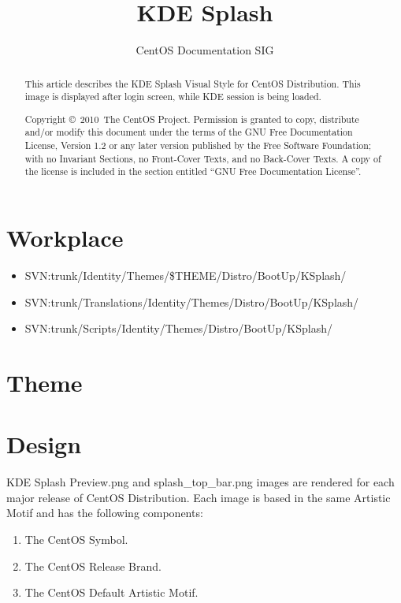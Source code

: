 \documentclass{article}
\title{KDE Splash}
\author{CentOS Documentation SIG}
\begin{document}
\maketitle

\begin{abstract} 

This article describes the KDE Splash Visual Style for CentOS
Distribution.  This image is displayed after login screen, while KDE
session is being loaded. 

Copyright \copyright\ 2010\ The CentOS Project. Permission is
granted to copy, distribute and/or modify this document under the
terms of the GNU Free Documentation License, Version 1.2 or any later
version published by the Free Software Foundation; with no Invariant
Sections, no Front-Cover Texts, and no Back-Cover Texts. A copy of the
license is included in the section entitled ``GNU Free Documentation
License''.  
\end{abstract}

\tableofcontents


\section{Workplace}
\begin{itemize}
\item SVN:trunk/Identity/Themes/\$THEME/Distro/BootUp/KSplash/
\item SVN:trunk/Translations/Identity/Themes/Distro/BootUp/KSplash/
\item SVN:trunk/Scripts/Identity/Themes/Distro/BootUp/KSplash/
\end{itemize}

\section{Theme}



\section{Design}

KDE Splash Preview.png and splash\_top\_bar.png images are rendered
for each major release of CentOS Distribution.  Each image is based in
the same Artistic Motif and has the following components:

\begin{enumerate}
\item The CentOS Symbol.
\item The CentOS Release Brand.
\item The CentOS Default Artistic Motif.
\end{enumerate}
\end{document}
